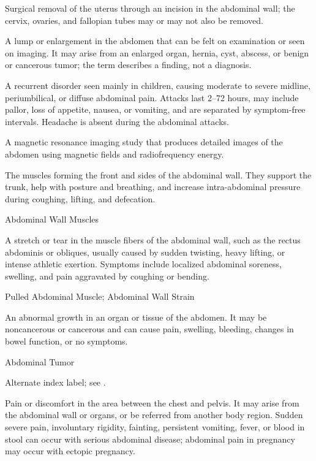  Surgical removal of the uterus through an incision in the abdominal wall; the cervix, ovaries, and fallopian tubes may or may not also be removed.

 A lump or enlargement in the abdomen that can be felt on examination or seen on imaging. It may arise from an enlarged organ, hernia, cyst, abscess, or benign or cancerous tumor; the term describes a finding, not a diagnosis.

 A recurrent disorder seen mainly in children, causing moderate to severe midline, periumbilical, or diffuse abdominal pain. Attacks last 2–72 hours, may include pallor, loss of appetite, nausea, or vomiting, and are separated by symptom-free intervals. Headache is absent during the abdominal attacks.

 A magnetic resonance imaging study that produces detailed images of the abdomen using magnetic fields and radiofrequency energy.

 The muscles forming the front and sides of the abdominal wall. They support the trunk, help with posture and breathing, and increase intra-abdominal pressure during coughing, lifting, and defecation.

\synonyms
Abdominal Wall Muscles

 A stretch or tear in the muscle fibers of the abdominal wall, such as the rectus abdominis or obliques, usually caused by sudden twisting, heavy lifting, or intense athletic exertion. Symptoms include localized abdominal soreness, swelling, and pain aggravated by coughing or bending.

\synonyms
Pulled Abdominal Muscle; Abdominal Wall Strain

 An abnormal growth in an organ or tissue of the abdomen. It may be noncancerous or cancerous and can cause pain, swelling, bleeding, changes in bowel function, or no symptoms.

\synonyms
Abdominal Tumor

 Alternate index label; see .

 Pain or discomfort in the area between the chest and pelvis. It may arise from the abdominal wall or organs, or be referred from another body region. Sudden severe pain, involuntary rigidity, fainting, persistent vomiting, fever, or blood in stool can occur with serious abdominal disease; abdominal pain in pregnancy may occur with ectopic pregnancy.

